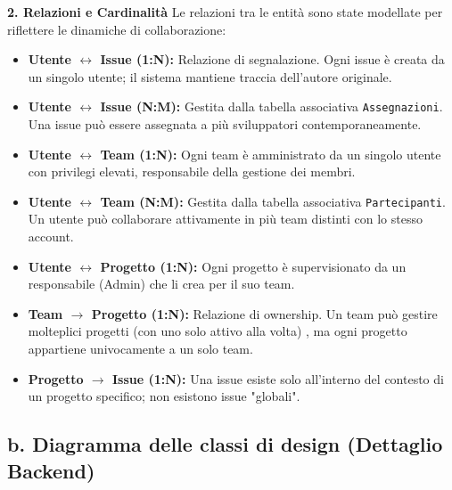 \documentclass[a4paper,12pt]{article}
\begin{document}
\begin{tcolorbox}
\textbf{2. Relazioni e Cardinalità}
Le relazioni tra le entità sono state modellate per riflettere le dinamiche di collaborazione:
\begin{itemize}
    \item \textbf{Utente $\leftrightarrow$ Issue (1:N):} Relazione di segnalazione. Ogni issue è creata da un singolo utente; il sistema mantiene traccia dell'autore originale.
    
    \item \textbf{Utente $\leftrightarrow$ Issue (N:M):} Gestita dalla tabella associativa \texttt{Assegnazioni}. Una issue può essere assegnata a più sviluppatori contemporaneamente.
    
    \item \textbf{Utente $\leftrightarrow$ Team (1:N):} Ogni team è amministrato da un singolo utente con privilegi elevati, responsabile della gestione dei membri.
    
    \item \textbf{Utente $\leftrightarrow$ Team (N:M):} Gestita dalla tabella associativa \texttt{Partecipanti}. Un utente può collaborare attivamente in più team distinti con lo stesso account.
    
    \item \textbf{Utente $\leftrightarrow$ Progetto (1:N):} Ogni progetto è supervisionato da un responsabile (Admin) che li crea per il suo team.
    
    \item \textbf{Team $\rightarrow$ Progetto (1:N):} Relazione di ownership. Un team può gestire molteplici progetti (con uno solo attivo alla volta) , ma ogni progetto appartiene univocamente a un solo team.
    
    \item \textbf{Progetto $\rightarrow$ Issue (1:N):} Una issue esiste solo all'interno del contesto di un progetto specifico; non esistono issue "globali".
\end{itemize}
\end{tcolorbox}

\newpage
\subsection*{b. Diagramma delle classi di design (Dettaglio Backend)}
{}
\end{document}
